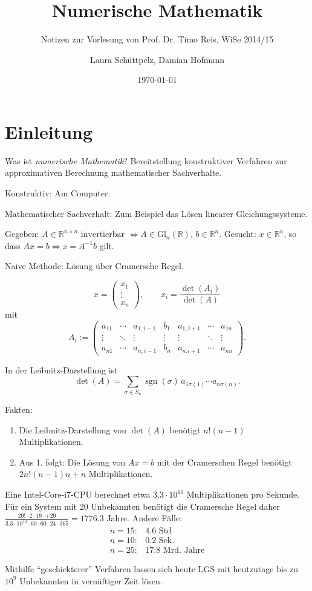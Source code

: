 \documentclass[11pt]{scrartcl}
\title{Numerische Mathematik}
\subtitle{Notizen zur Vorlesung von Prof. Dr. Timo Reis, WiSe 2014/15}
\author{Laura Schüttpelz, Damian Hofmann}
\date{\today}
\newcommand*{\RR}{\mathbb R}
\newcommand*{\Gl}{\mathrm{Gl}}
\newcommand{\e}[1]{\cdot 10^{#1}}
\DeclareMathOperator*{\sgn}{\mathrm{sgn}}
\theoremstyle{break}
\theoremstyle{remark}
\begin{document}
\maketitle

\section{Einleitung}
Was ist \emph{numerische Mathematik}? Bereitstellung konstruktiver Verfahren zur approximativen Berechnung mathematischer Sachverhalte.

Konstruktiv: Am Computer.

Mathematischer Sachverhalt: Zum Beispiel das Lösen linearer Gleichungssysteme.

\begin{Beispiel}

Gegeben: $A \in \RR^{n\times n} \text{ invertierbar } \Leftrightarrow A \in \Gl_n(\RR)$,
$b \in \RR^n$.
Gesucht: $x \in \RR^n$, so dass $Ax = b \Leftrightarrow x = A^{-1} b$ gilt.

Naive Methode: Lösung über Cramersche Regel.

$$x = \begin{pmatrix}x_1 \\ \vdots \\ x_n \end{pmatrix}, \qquad x_i = \frac{\det(A_i)}{\det(A)}$$
mit $$A_i :=
\begin{pmatrix}
  a_{11} & \cdots & a_{1,i-1} & b_1 & a_{1,i+1} & \cdots & a_{1n} \\
  \vdots & \ddots & \vdots & \vdots & \vdots & \ddots & \vdots \\
  a_{n1} & \cdots & a_{n,i-1} & b_n & a_{n.i+1} & \cdots & a_{nn}
\end{pmatrix}.$$

In der Leibnitz-Darstellung ist $$\det(A) = \sum_{\sigma\in S_n} \sgn(\sigma)\, a_{1\sigma(1)} \cdots a_{n\sigma(n)}.$$

Fakten:
\begin{enumerate}
\item Die Leibnitz-Darstellung von $\det(A)$ benötigt $n! (n-1)$ Multiplikationen.
\item Aus 1. folgt: Die Lösung von $Ax=b$ mit der Cramerschen Regel benötigt $2n!(n-1)n + n$
      Multiplikationen.
\end{enumerate}

Eine Intel-Core-i7-CPU berechnet etwa $3.3\e{10}$ Multiplikationen pro Sekunde.
Für ein System mit 20 Unbekannten benötigt die Cramersche Regel daher
$ \frac{20! \cdot 2 \cdot 19 \cdot +20}{3.3 \cdot 10^{10}
\cdot 60 \cdot 60 \cdot 24 \cdot 365} = 1776.3$ Jahre.
Andere Fälle:
\begin{align*}
n = 15\colon & 4.6\text{ Std}\\
n = 10\colon & 0.2\text{ Sek.}\\
n = 25\colon & 17.8\text{ Mrd. Jahre}
\end{align*}

Mithilfe "`geschickterer"' Verfahren lassen sich heute LGS mit heutzutage bis zu $10^9$
Unbekannten in vernüftiger Zeit lösen.
\end{Beispiel}
\end{document}
